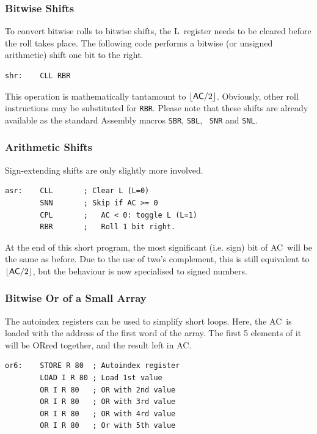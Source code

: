 \documentclass[11pt,a4paper,twocolumns]{article}
\newcommand\register[1]{\textsf{#1}}
\newcommand\A{\register{AC}}
\newcommand\Lreg{\register{L}}
\begin{document}
\subsubsection{Bitwise Shifts}

To convert bitwise rolls to bitwise shifts, the \Lreg\ register needs
to be cleared before the roll takes place. The following code performs
a bitwise (or unsigned arithmetic) shift one bit to the right.

\begin{verbatim}
shr:    CLL RBR
\end{verbatim}

This operation is mathematically tantamount to
$\lfloor\mbox{\A}/2\rfloor$. Obviously, other roll instructions may be
substituted for {\tt RBR}. Please note that these shifts are already
available as the standard Assembly macros {\tt SBR}, {\tt SBL}, {\tt
  SNR} and {\tt SNL}.

\subsubsection{Arithmetic Shifts}

Sign-extending shifts are only slightly more involved.

\begin{verbatim}
asr:    CLL       ; Clear L (L=0)
        SNN       ; Skip if AC >= 0
        CPL       ;   AC < 0: toggle L (L=1)
        RBR       ;   Roll 1 bit right.
\end{verbatim}

At the end of this short program, the most significant (i.e. sign) bit
of \A\ will be the same as before. Due to the use of two's complement,
this is still equivalent to $\lfloor\mbox{\A}/2\rfloor$, but the
behaviour is now specialised to signed numbers.

\subsubsection{Bitwise Or of a Small Array}

The autoindex registers can be used to simplify short loops. Here, the
\A\ is loaded with the address of the first word of the array. The
first 5 elements of it will be ORred together, and the result left in
\A.

\begin{verbatim}
or6:    STORE R 80  ; Autoindex register
        LOAD I R 80 ; Load 1st value
        OR I R 80   ; OR with 2nd value
        OR I R 80   ; OR with 3rd value
        OR I R 80   ; OR with 4rd value
        OR I R 80   ; Or with 5th value
\end{verbatim}
\end{document}
